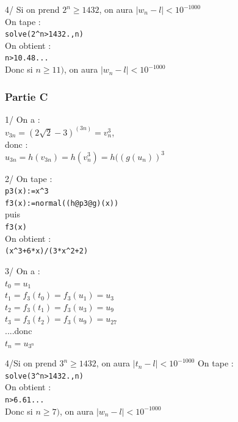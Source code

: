 \documentclass[a4paper,11pt]{book}
\begin{document}
4/ Si on prend  $2^n \geq 1432$, on aura $|w_n-l|<10^{-1000}$\\
On tape :\\
{\tt solve(2\verb|^|n>1432.,n)}\\
On obtient :\\
 {\tt n>10.48...}\\ 
Donc si $n\geq 11)$, on aura $|w_n-l|<10^{-1000}$
\subsubsection{Partie C}
1/ On a :\\
$v_{3n}=(2\sqrt 2-3)^(3n)=v_n^3$, \\
donc :\\ 
$u_{3n}=h(v_{3n})=h(v_n^3)=h((g(u_n))^3$ 

2/ On tape :\\
{\tt p3(x):=x\verb|^|3}\\
{\tt f3(x):=normal((h@p3@g)(x))}\\
puis \\
{\tt f3(x)}\\
On obtient :\\
 {\tt (x\verb|^|3+6*x)/(3*x\verb|^|2+2)}

3/ On a :\\
$t_0=u_1$\\
$t_1=f_3(t_0)=f_3(u_1)=u_3$\\
$t_2=f_3(t_1)=f_3(u_3)=u_9$\\
$t_3=f_3(t_2)=f_3(u_9)=u_27$\\
....donc \\
$t_n=u_{3^n}$

4/Si on prend  $3^n \geq 1432$, on aura $|t_n-l|<10^{-1000}$
On tape :\\
{\tt solve(3\verb|^|n>1432.,n)}\\
On obtient :\\
 {\tt n>6.61...}\\ 
Donc si $n\geq 7)$, on aura $|w_n-l|<10^{-1000}$
\end{document}
